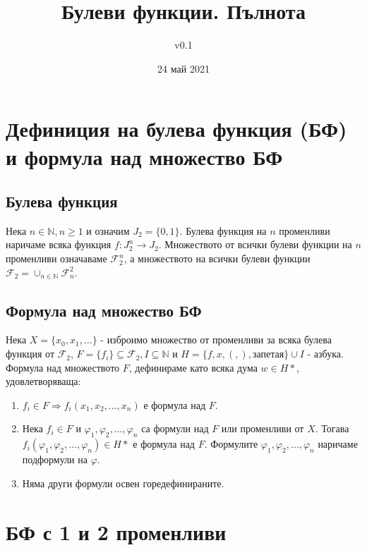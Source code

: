 \documentclass[fleqn,12pt]{article}
\title{Булеви функции. Пълнота}
\author{v0.1}
\date{24 май 2021}
\begin{document}
\maketitle

\tableofcontents

\begin{flushleft}

\section{Дефиниция на булева функция (БФ) и формула над множество БФ}

\subsection{Булева функция}
Нека $n \in \mathbb{N}, n \geq 1$ и означим $J_2 = \{ 0, 1 \}$. 
Булева функция на $n$ променливи наричаме всяка функция $f : J_2^n \rightarrow J_2$.
Множеството от всички булеви функции на $n$ променливи означаваме
$\mathcal{F}_2^n$, а множеството на всички булеви функции $\mathcal{F}_2 = \cup_{n \in \mathbb{N}} \mathcal{F}^2_n$.

\subsection{Формула над множество БФ}
Нека $X = \{ x_0, x_1, \dots \}$ - изброимо множество от променливи за
всяка булева функция от $\mathcal{F}_2$, $F = \{ f_i \} \subseteq \mathcal{F}_2, I \subseteq \mathbb{N}$
и $H = \{ f, x, (, ), \text{запетая}  \} \cup I $ - азбука.
Формула над множеството $F$, дефинираме като всяка дума $w \in H*$, удовлетворяваща:
\begin{enumerate}
    \item $f_i \in F \Rightarrow f_i(x_1,x_2,\dots,x_n)$ е формула над $F$.
    \item \label{formulas:superposition} Нека $f_i \in F$ и $\varphi_1, \varphi_2, \dots, \varphi_n$ са формули над $F$ или променливи от $X$.
    Тогава $f_i(\varphi_1, \varphi_2, \dots, \varphi_n) \in H*$ е формула над $F$. Формулите $\varphi_1, \varphi_2, \dots, \varphi_n$ наричаме подформули на $\varphi$.
    \item Няма други формули освен горедефинираните.
\end{enumerate}

\section{БФ с 1 и 2 променливи}


\end{flushleft}
\end{document}
